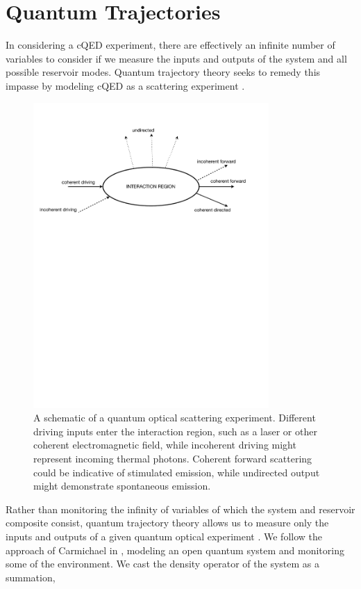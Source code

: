\section{Quantum Trajectories}
In considering a cQED experiment, there are effectively an infinite number of variables to consider if we measure the inputs and outputs of the system and all possible reservoir modes. Quantum trajectory theory seeks to remedy this impasse by modeling cQED as a scattering experiment \cite{howard2}.
%
\begin{figure}[htb]
\begin{center}
\includegraphics[width=0.8\textwidth]{Figures/2Scattering}
\caption[A schematic of a quantum optical scattering experiment]{\small{A schematic of a quantum optical scattering experiment. Different driving inputs enter the interaction region, such as a laser or other coherent electromagnetic field, while incoherent driving might represent incoming thermal photons. Coherent forward scattering could be indicative of stimulated emission, while undirected output might demonstrate spontaneous emission.}}
\label{fig2Scattering}
\end{center}
\end{figure}
%
Rather than monitoring the infinity of variables of which the system and reservoir composite consist, quantum trajectory theory allows us to measure only the inputs and outputs of a given quantum optical experiment \cite{howard2}. We follow the approach of Carmichael in \cite{howard2}, modeling an open quantum system and monitoring some of the environment. We cast the density operator of the system as a summation,
